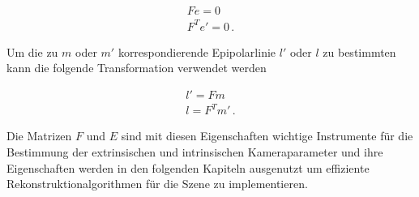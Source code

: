\begin{gather}
	Fe = 0\\
	F^Te' = 0 \, .
\end{gather}

Um die zu $m$ oder $m'$ korrespondierende Epipolarlinie $l'$ oder $l$ zu bestimmten kann die folgende Transformation verwendet werden\cite{HZ,phdTwoView,HZ8,ZZGXr,phdextrinsicPara}%

\begin{gather}
	l' = Fm\\
	l = F^Tm' \, .
\end{gather}

Die Matrizen $F$ und $E$ sind mit diesen Eigenschaften wichtige Instrumente für die Bestimmung der extrinsischen und intrinsischen Kameraparameter und ihre Eigenschaften werden in den folgenden Kapiteln ausgenutzt um effiziente Rekonstruktionalgorithmen für die Szene zu implementieren. 




